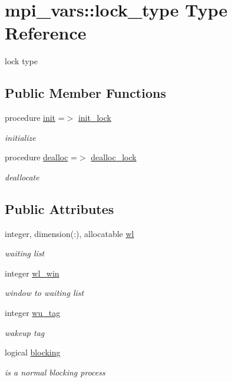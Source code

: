 \hypertarget{structmpi__vars_1_1lock__type}{}\section{mpi\+\_\+vars\+:\+:lock\+\_\+type Type Reference}
\label{structmpi__vars_1_1lock__type}


lock type  


\subsection*{Public Member Functions}
\begin{DoxyCompactItemize}
\item 
procedure \hyperlink{structmpi__vars_1_1lock__type_abb38fce763fc0925e6bb7d69162e68b0}{init} =$>$ \hyperlink{namespacempi__vars_ab38aeec20e567cf6f272587890ead066}{init\+\_\+lock}
\begin{DoxyCompactList}\small\item\em initialize \end{DoxyCompactList}\item 
procedure \hyperlink{structmpi__vars_1_1lock__type_a3b633d333ce2963fbe05e99badd00606}{dealloc} =$>$ \hyperlink{namespacempi__vars_af03c942b5f1c980adf9e1b2ba3f4bd58}{dealloc\+\_\+lock}
\begin{DoxyCompactList}\small\item\em deallocate \end{DoxyCompactList}\end{DoxyCompactItemize}
\subsection*{Public Attributes}
\begin{DoxyCompactItemize}
\item 
integer, dimension(\+:), allocatable \hyperlink{structmpi__vars_1_1lock__type_a1bc45d5db890c080c843318662050565}{wl}
\begin{DoxyCompactList}\small\item\em waiting list \end{DoxyCompactList}\item 
integer \hyperlink{structmpi__vars_1_1lock__type_a19ac8404814735597e92c647e31745ad}{wl\+\_\+win}
\begin{DoxyCompactList}\small\item\em window to waiting list \end{DoxyCompactList}\item 
integer \hyperlink{structmpi__vars_1_1lock__type_ae13a02ff3985d06c3455b2ae29210cc4}{wu\+\_\+tag}
\begin{DoxyCompactList}\small\item\em wakeup tag \end{DoxyCompactList}\item 
logical \hyperlink{structmpi__vars_1_1lock__type_a53ce091d52f98ca430a9e97f8bf0c0f4}{blocking}
\begin{DoxyCompactList}\small\item\em is a normal blocking process \end{DoxyCompactList}\end{DoxyCompactItemize}


